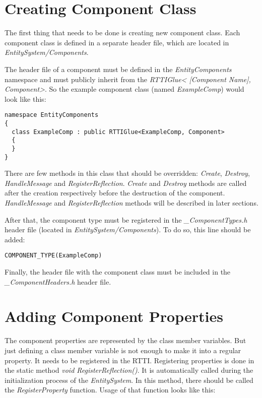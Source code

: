 \documentclass[a4paper, 12pt]{report}
\begin{document}
\section{Creating Component Class}
The first thing that needs to be done is creating new component class. Each component class is defined in a separate header file, which are located in \emph{EntitySystem/Components}.

The header file of a component must be defined in the \emph{EntityComponents} namespace and must publicly inherit from the  \emph{RTTIGlue< [Component Name], Component>}. So the example component class (named \emph{ExampleComp}) would look like this:

\footnotesize 
\begin{verbatim}
namespace EntityComponents
{
  class ExampleComp : public RTTIGlue<ExampleComp, Component>
  {
  }
}
\end{verbatim}
\normalsize

There are few methods in this class that should be overridden: \emph{Create}, \emph{Destroy}, \emph{HandleMessage} and \emph{RegisterReflection}. \emph{Create} and \emph{Destroy} methods are called after the creation respectively before the destruction of the component. \emph{HandleMessage} and \emph{RegisterReflection} methods will be described in later sections.

After that, the component type must be registered in the \emph{\_ComponentTypes.h} header file (located in \emph{EntitySystem/Components}). To do so, this line should be added:
\footnotesize 
\begin{verbatim}
COMPONENT_TYPE(ExampleComp)
\end{verbatim}
\normalsize

Finally, the header file with the component class must be included in the \emph{\_ComponentHeaders.h} header file.

\section{Adding Component Properties}

The component properties are represented by the class member variables. But just defining a class member variable is not enough to make it into a regular property. It needs to be registered in the RTTI. Registering properties is done in the static method \emph{void RegisterReflection()}. It is automatically called during the initialization process of the \emph{EntitySystem}. In this method, there should be called the \emph{RegisterProperty} function. Usage of that function looks like this:
\end{document}

